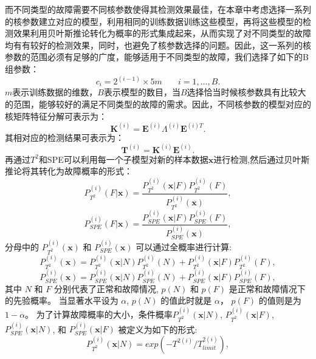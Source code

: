 而不同类型的故障需要不同核参数使得其检测效果最佳，在本章中考虑选择一系列的核参数建立对应的模型，利用相同的训练数据训练这些模型，再将这些模型的检测效果利用贝叶斯推论转化为概率的形式集成起来，从而实现了对不同类型的故障均有有较好的检测效果，同时，也避免了核参数选择的问题。因此，这一系列的核参数的范围必须有足够的广度，能够适用于不同类型的故障，我们选择了如下的B组参数：
\begin{equation}
c_i=2^{(i-1)}\times5m ~~~~\quad i=1,\ldots,B.
\end{equation}
$m$表示训练数据的维数，$B$表示模型的数目，当$B$选择恰当时候核参数具有比较大的范围，能够较好的满足不同类型的故障的需求。因此，不同核参数的模型对应的核矩阵特征分解可表示为：
\begin{equation}\label{}
\textbf{K}^{(i)}=\textbf{E}^{(i)}\Lambda^{(i)}\textbf{E}^{(i)T}.
\end{equation}
其相对应的检测结果可表示为：
\begin{equation}\label{}
\textbf{T}^{(i)}=\textbf{K}^{(i)}\textbf{E}^{(i)}.
\end{equation}
再通过$T^2$和SPE可以利用每一个子模型对新的样本数据$\textbf{x}$进行检测,然后通过贝叶斯推论将其转化为故障概率的形式：
\begin{equation}\label{18}
P^{(i)}_{T^2}(F|\textbf{x})=\frac{P^{(i)}_{T^2}(\textbf{x}|F)P^{(i)}_{T^2}(F)}{P^{(i)}_{T^2}(\textbf{x})},
\end{equation}
\begin{equation}\label{19}
P^{(i)}_{SPE}(F|\textbf{x})=\frac{P^{(i)}_{SPE}(\textbf{x}|F)P^{(i)}_{SPE}(F)}{P^{(i)}_{SPE}(\textbf{x})},
\end{equation}
分母中的 $P^{(i)}_{T^2}(\textbf{x})$ 和 $P^{(i)}_{SPE}(\textbf{x})$ 可以通过全概率进行计算:
\begin{equation}\label{}
P^{(i)}_{T^2}(\textbf{x})=P^{(i)}_{T^2}(\textbf{x}|N) P^{(i)}_{T^2}(N)+P^{(i)}_{T^2}(\textbf{x}|F)P^{(i)}_{T^2}(F),
\end{equation}
\begin{equation}\label{}
P^{(i)}_{SPE}(\textbf{x})=P^{(i)}_{SPE}(\textbf{x}|N) P^{(i)}_{SPE}(N)+P^{(i)}_{SPE}(\textbf{x}|F) P^{(i)}_{SPE}(F),
\end{equation}
其中 $N$ 和 $F$ 分别代表了正常和故障情况,
$p(N)$ 和 $p(F)$ 是正常和故障情况下的先验概率。
当显著水平设为 $\alpha$,
$p(N)$ 的值此时就是 $\alpha$， $p(F)$ 的值则是为 $1-\alpha$。
为了计算故障概率的大小，条件概率$P^{(i)}_{T^2}(\textbf{x}|N)$,
$P^{(i)}_{T^2}(\textbf{x}|F)$, $P^{(i)}_{SPE}(\textbf{x}|N)$,
和 $P^{(i)}_{SPE}(\textbf{x}|F)$
被定义为如下的形式:
\begin{equation}\label{}
P^{(i)}_{T^2}(\textbf{x}|N)=exp(-T^{2(i)}/T^{2(i)}_{limit}),
\end{equation}
